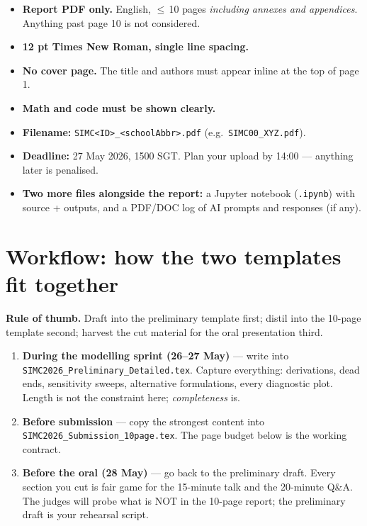 \documentclass[11pt,a4paper]{article}
\begin{document}
\begin{rulebox}
\begin{itemize}[leftmargin=*, itemsep=2pt]
\item \textbf{Report PDF only.} English, $\leq$\,10 pages \emph{including annexes and appendices}. Anything past page 10 is not considered.
\item \textbf{12 pt Times New Roman, single line spacing.}
\item \textbf{No cover page.} The title and authors must appear inline at the top of page 1.
\item \textbf{Math and code must be shown clearly.}
\item \textbf{Filename:} \texttt{SIMC<ID>\_<schoolAbbr>.pdf} (e.g.\ \texttt{SIMC00\_XYZ.pdf}).
\item \textbf{Deadline:} 27 May 2026, 1500 SGT. Plan your upload by 14:00 — anything later is penalised.
\item \textbf{Two more files alongside the report:} a Jupyter notebook (\texttt{.ipynb}) with source + outputs, and a PDF/DOC log of AI prompts and responses (if any).
\end{itemize}
\end{rulebox}

\section{Workflow: how the two templates fit together}

\begin{tipbox}
\textbf{Rule of thumb.} Draft into the preliminary template first; distil into the 10-page template second; harvest the cut material for the oral presentation third.
\end{tipbox}

\begin{enumerate}[leftmargin=*]
\item \textbf{During the modelling sprint (26–27 May)} — write into \texttt{SIMC2026\_Preliminary\_Detailed.tex}. Capture everything: derivations, dead ends, sensitivity sweeps, alternative formulations, every diagnostic plot. Length is not the constraint here; \emph{completeness} is.

\item \textbf{Before submission} — copy the strongest content into \texttt{SIMC2026\_Submission\_10page.tex}. The page budget below is the working contract.

\item \textbf{Before the oral (28 May)} — go back to the preliminary draft. Every section you cut is fair game for the 15-minute talk and the 20-minute Q\&A. The judges will probe what is NOT in the 10-page report; the preliminary draft is your rehearsal script.
\end{enumerate}
\end{document}
